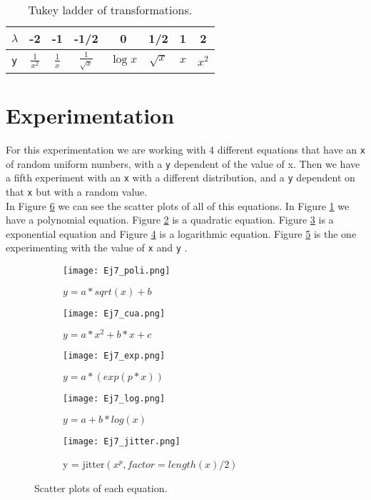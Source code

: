 \documentclass{article}
\begin{document}
\begin{table}[]\caption{Tukey ladder of transformations.}\label{tab1}
\centering
\begin{tabular}{| l | c | c | c | c | c | c | c |}
\hline
$\lambda$ & -2&  -1& -1/2 & 0  &1/2 & 1 & 2\\
\hline 
\texttt{y} & $\frac{1}{x^2}$ & $\frac{1}{x}$ &  $\frac{1}{\sqrt{x}}$ & $\log x$ & $\sqrt{x}$ & $x$ & $x^2$\\
\hline 
\end{tabular}
\end{table}


\section{Experimentation}

For this experimentation we are working with 4 different equations that have an \texttt{x} of random uniform numbers, with a \texttt{y} dependent of the value of x. Then we have a fifth experiment with an \texttt{x} with a different distribution, and a \texttt{y} dependent on that \texttt{x} but with a random value.\\

In Figure \ref{fig1} we can see the scatter plots of all of this equations. In Figure \ref{sb1-1} we have a polynomial equation. Figure \ref{sb1-2} is a quadratic equation. Figure \ref{sb1-3} is a exponential equation and Figure \ref{sb1-4} is a logarithmic equation. Figure \ref{sb1-5} is the one experimenting with the value of \texttt{x} and \texttt{y} . \\

\begin{figure}[]
\begin{subfigure}{.3\textwidth}
  \centering
  \texttt{[image: Ej7\_poli.png]}  
  \caption{$y = a * sqrt(x) + b$ }
  \label{sb1-1}
\end{subfigure}
\begin{subfigure}{.3\textwidth}
  \centering
  \texttt{[image: Ej7\_cua.png]}  
  \caption{$y = a*x^2 + b*x + c$}
  \label{sb1-2}
\end{subfigure}
\begin{subfigure}{.3\textwidth}
  \centering
  \texttt{[image: Ej7\_exp.png]}  
  \caption{$y = a * (exp(p * x))  $}
  \label{sb1-3}
\end{subfigure}
\newline
\begin{subfigure}{.5\textwidth}
  \centering
  \texttt{[image: Ej7\_log.png]}  
  \caption{$y = a + b * log(x) $}
  \label{sb1-4}
\end{subfigure}
\begin{subfigure}{.5\textwidth}
  \centering
  \texttt{[image: Ej7\_jitter.png]}  
  \caption{y = jitter$(x^p, factor = length(x)/2)$}
  \label{sb1-5}
\end{subfigure}
\caption{Scatter plots of each equation.}
\label{fig1}
\end{figure}
\end{document}
